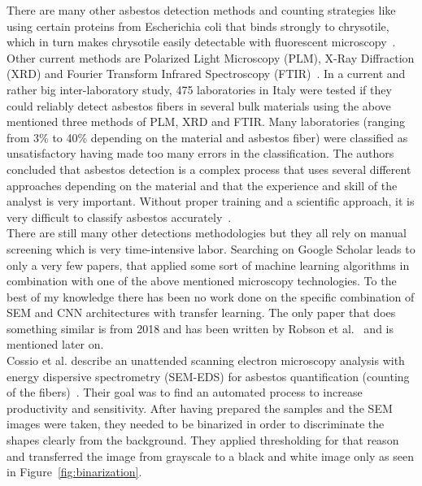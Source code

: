 There are many other asbestos detection methods and counting strategies like using certain proteins from Escherichia coli that binds strongly to chrysotile, which in turn makes chrysotile easily detectable with fluorescent microscopy~\cite{kuroda2008detection}. Other current methods are Polarized Light Microscopy (PLM), X-Ray Diffraction (XRD) and Fourier Transform Infrared Spectroscopy (FTIR)~\cite{campopiano2018inter}. In a current and rather big inter-laboratory study, 475 laboratories in Italy were tested if they could reliably detect asbestos fibers in several bulk materials using the above mentioned three methods of PLM, XRD and FTIR. Many laboratories (ranging from 3\% to 40\% depending on the material and asbestos fiber) were classified as unsatisfactory having made too many errors in the classification. The authors concluded that asbestos detection is a complex process that uses several different approaches depending on the material and that the experience and skill of the analyst is very important. Without proper training and a scientific approach, it is very difficult to classify asbestos accurately~\cite{campopiano2018inter}. \\

There are still many other detections methodologies but they all rely on manual screening which is very time-intensive labor. Searching on Google Scholar leads to only a very few papers, that applied some sort of machine learning algorithms in combination with one of the above mentioned microscopy technologies. To the best of my knowledge there has been no work done on the specific combination of SEM and CNN architectures with transfer learning. The only paper that does something similar is from 2018 and has been written by Robson et al.~\cite{robson2018fiac} and is mentioned later on. \\

Cossio et al. describe an unattended scanning electron microscopy analysis with energy dispersive spectrometry (SEM-EDS) for asbestos quantification (counting of the fibers)~\cite{cossio2018innovative}. Their goal was to find an automated process to increase productivity and sensitivity. After having prepared the samples and the SEM images were taken, they needed to be binarized in order to discriminate the shapes clearly from the background. They applied thresholding for that reason and transferred the image from grayscale to a black and white image only as seen in Figure~\ref{fig:binarization}.

